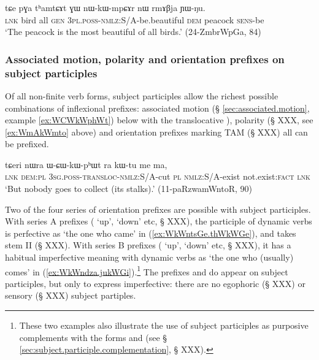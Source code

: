  \begin{exe} 
\ex \label{ex:thamtCAt.GW.nWkWmpCAr}
\gll tɕe pɣa tʰamtɕɤt ɣɯ nɯ-kɯ-mpɕɤr nɯ rmɤβja ɲɯ-ŋu.  \\
\textsc{lnk} bird all \textsc{gen} \textsc{3pl}.\textsc{poss}-\textsc{nmlz}:S/A-be.beautiful \textsc{dem} peacock \textsc{sens}-be \\
\glt `The peacock is the most beautiful of all birds.' (24-ZmbrWpGa, 84)
\end{exe}

\subsubsection{Associated motion, polarity and orientation prefixes on subject participles}  \label{sec:subject.participle.other.prefixes}
Of all non-finite verb forms, subject participles allow the richest possible combinations of inflexional prefixes: associated motion (§ \ref{sec:associated.motion}, example \ref{ex:WCWkWphWt}) below with the translocative ), polarity (§ XXX, see \ref{ex:WmAkWmto} above) and orientation prefixes marking TAM (§ XXX) all can be prefixed. 
 
\begin{exe}
\ex \label{ex:WCWkWphWt}
 \gll tɕeri nɯra ɯ-ɕɯ-kɯ-pʰɯt ra kɯ-tu me ma,   \\
 \textsc{lnk} \textsc{dem}:\textsc{pl} \textsc{3sg}.\textsc{poss}-\textsc{transloc}-\textsc{nmlz}:S/A-cut \textsc{pl} \textsc{nmlz}:S/A-exist not.exist:\textsc{fact} \textsc{lnk} \\
 \glt `But nobody goes to collect (its stalks).' (11-paRzwamWntoR, 90)
\end{exe}

Two of the four series of orientation prefixes are possible with subject participles. With series A prefixes ( `up',  `down' etc, § XXX), the participle of dynamic verbs is perfective as  `the one who came' in (\ref{ex:WkWntsGe.thWkWGe}), and takes stem II (§ XXX). With series B prefixes ( `up',  `down' etc, § XXX), it has a habitual imperfective meaning with dynamic verbs as  `the one who (usually) comes' in (\ref{ex:WkWndza.jukWGi}).\footnote{These two examples also illustrate the use of subject participles as purposive complements with the forms  and  (see § \ref{sec:subject.participle.complementation}, § XXX).} The prefixes and  do appear on subject participles, but only to express imperfective: there are no egophoric (§ XXX) or sensory (§ XXX) subject partiples.

